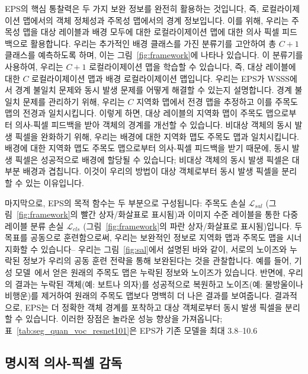 \documentclass[final]{cvpr}
\begin{document}
EPS의 핵심 통찰력은 두 가지 보완 정보를 완전히 활용하는 것입니다, 즉, 로컬라이제이션 맵에서의 객체 정체성과 주목성 맵에서의 경계 정보입니다. 이를 위해, 우리는 주목성 맵을 대상 레이블과 배경 모두에 대한 로컬라이제이션 맵에 대한 의사 픽셀 피드백으로 활용합니다. 우리는 추가적인 배경 클래스를 가진 분류기를 고안하여 총 $C+1$ 클래스를 예측하도록 하며, 이는 그림~\ref{fig:framework}에 나타나 있습니다. 이 분류기를 사용하여, 우리는 $C+1$ 로컬라이제이션 맵을 학습할 수 있습니다, 즉, 대상 레이블에 대한 $C$ 로컬라이제이션 맵과 배경 로컬라이제이션 맵입니다.
우리는 EPS가 WSSS에서 경계 불일치 문제와 동시 발생 문제를 어떻게 해결할 수 있는지 설명합니다. 경계 불일치 문제를 관리하기 위해, 우리는 $C$ 지역화 맵에서 전경 맵을 추정하고 이를 주목도 맵의 전경과 일치시킵니다. 이렇게 하면, 대상 레이블의 지역화 맵이 주목도 맵으로부터 의사-픽셀 피드백을 받아 객체의 경계를 개선할 수 있습니다. 비대상 객체의 동시 발생 픽셀을 완화하기 위해, 우리는 배경에 대한 지역화 맵도 주목도 맵과 일치시킵니다. 배경에 대한 지역화 맵도 주목도 맵으로부터 의사-픽셀 피드백을 받기 때문에, 동시 발생 픽셀은 성공적으로 배경에 할당될 수 있습니다; 비대상 객체의 동시 발생 픽셀은 대부분 배경과 겹칩니다. 이것이 우리의 방법이 대상 객체로부터 동시 발생 픽셀을 분리할 수 있는 이유입니다.

마지막으로, EPS의 목적 함수는 두 부분으로 구성됩니다: {주목도 손실} $\mathcal{L}_{sal}$ (그림~\ref{fig:framework}의 빨간 상자/화살표로 표시됨)과 이미지 수준 레이블을 통한 {다중 레이블 분류 손실} $\mathcal{L}_{cls}$ (그림~\ref{fig:framework}의 파란 상자/화살표로 표시됨)입니다. 두 목표를 공동으로 훈련함으로써, 우리는 보완적인 정보로 지역화 맵과 주목도 맵을 시너지화할 수 있습니다-- 우리는 그림~\ref{fig:sal}에서 설명된 바와 같이, 서로의 노이즈와 누락된 정보가 우리의 공동 훈련 전략을 통해 보완된다는 것을 관찰합니다. 예를 들어, 기성 모델~\cite{hou2017deeply,nguyen2019deepusps,zhao2019pyramid}에서 얻은 원래의 주목도 맵은 누락된 정보와 노이즈가 있습니다. 반면에, 우리의 결과는 누락된 객체(예: 보트나 의자)를 성공적으로 복원하고 노이즈(예: 물방울이나 비행운)를 제거하여 원래의 주목도 맵보다 명백히 더 나은 결과를 보여줍니다. 결과적으로, EPS는 더 정확한 객체 경계를 포착하고 대상 객체로부터 동시 발생 픽셀을 분리할 수 있습니다. 이러한 장점은 놀라운 성능 향상을 가져옵니다; 표~\ref{tab:seg_quan_voc_resnet101}은 EPS가 기존 모델을 최대 3.8--10.6%

\subsection{명시적 의사-픽셀 감독}\label{section3.2}
\end{document}
